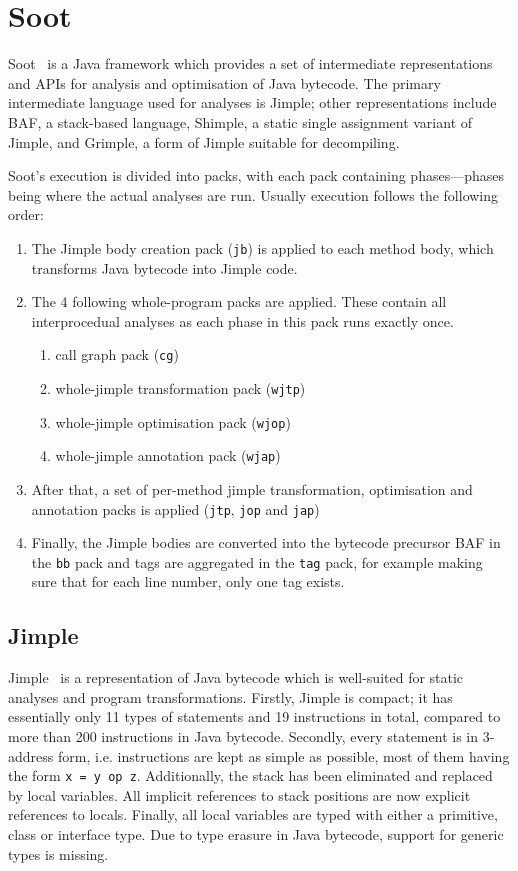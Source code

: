 \section{Soot}
Soot~\cite{vallee1999soot} is a Java framework which provides a set of intermediate representations and APIs for analysis and optimisation of Java bytecode. The primary intermediate language used for analyses is Jimple; other representations include BAF, a stack-based language, Shimple, a static single assignment variant of Jimple, and Grimple, a form of Jimple suitable for decompiling.

Soot's execution is divided into packs, with each pack containing phases---phases being where the actual analyses are run. Usually execution follows the following order:
\begin{enumerate}
    \item The Jimple body creation pack (\texttt{jb}) is applied to each method body, which transforms Java bytecode into Jimple code.
    \item The 4 following whole-program packs are applied. These contain all interprocedual analyses as each phase in this pack runs exactly once.
    \begin{enumerate}
        \item call graph pack (\texttt{cg})
        \item whole-jimple transformation pack (\texttt{wjtp})
        \item whole-jimple optimisation pack (\texttt{wjop})
        \item whole-jimple annotation pack (\texttt{wjap})
    \end{enumerate}
    \item After that, a set of per-method jimple transformation, optimisation and annotation packs is applied (\texttt{jtp}, \texttt{jop} and \texttt{jap})
    \item Finally, the Jimple bodies are converted into the bytecode precursor BAF in the \texttt{bb} pack and tags are aggregated in the \texttt{tag} pack, for example making sure that for each line number, only one tag exists.
\end{enumerate}

\subsection{Jimple}
\label{subsect:jimple}
Jimple~\cite{vallee1999soot} is a representation of Java bytecode which is well-suited for static analyses and program transformations. Firstly, Jimple is compact; it has essentially only 11 types of statements and 19 instructions in total, compared to more than 200 instructions in Java bytecode. Secondly, every statement is in 3-address form, i.e. instructions are kept as simple as possible, most of them having the form \texttt{x = y op z}. Additionally, the stack has been eliminated and replaced by local variables. All implicit references to stack positions are now explicit references to locals. Finally, all local variables are typed with either a primitive, class or interface type. Due to type erasure in Java bytecode, support for generic types is missing.

